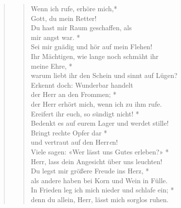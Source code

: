 
 
 
 \begin{quote}
  

\begin{verse}
 
 Wenn ich rufe, erhöre mich,*\\
Gott, du mein Retter! \\
\vin Du hast mir Raum  geschaffen, als \\ \vin mir angst war. * \\
\vin Sei mir gnädig und hör auf mein Flehen!\\
 Ihr Mächtigen, wie lange noch schmäht ihr \\ meine Ehre, *\\
 warum liebt ihr den Schein und sinnt auf Lügen? \\
\vin Erkennt doch: Wunderbar handelt \\ \vin der Herr an den Frommen; *\\
\vin der Herr erhört mich, wenn ich zu ihm rufe.\\
Ereifert ihr euch, so sündigt nicht! *\\
 Bedenkt es auf eurem Lager und werdet stille! \\
\vin Bringt rechte Opfer dar *\\
\vin und vertraut auf den Herr\textit{e}n! \\
 Viele sagen: «Wer lässt uns Gutes erleben?» *\\
 Herr, lass dein Angesicht über uns leuchten! \\
\vin Du legst mir größere Freude ins Herz, *\\
\vin als andere haben bei Korn und Wein in Fülle.\\
 In Frieden leg ich mich nieder und schlafe ein; *\\
 denn du allein, Herr, lässt mich sorglos ruhen. 


\end{verse}

 \end{quote}


